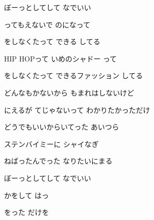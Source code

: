 \documentclass[a4paper,tate,twocolumn,12pt]{ltjtarticle}
\begin{document}
\begin{flushleft}
\begin{minipage}{\linewidth}
ぼーっとしてして なでいい
\end{minipage}

\vspace{2em}

\noindent\begin{minipage}{\linewidth}
ってもえないで のになって

をしなくたって できる してる

HIP HOPって いめのシャドー って

をしなくたって できるファッション してる
\end{minipage}

\vspace{2em}

\noindent\begin{minipage}{\linewidth}
どんなもかないから もまれはしないけど

にえるが てじゃないって わかりたかっただけ
\end{minipage}

\vspace{2em}

\noindent\begin{minipage}{\linewidth}
どうでもいいからいてった あいつら

ステンバイミーに シャイなぎ

ねばったんでった なりたいにまる

ぼーっとしてして なでいい
\end{minipage}

\vspace{2em}

\noindent\begin{minipage}{\linewidth}
かをして はっ

をった だけを 


\end{minipage}
\end{flushleft}
\end{document}
